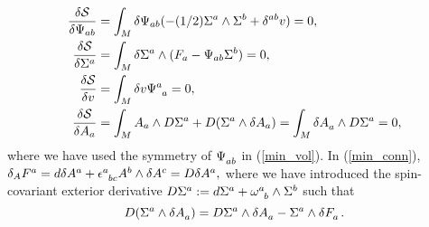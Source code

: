 \documentclass[a4paper,12pt, onecolumn, notitlepage]{article}
\theoremstyle{definition}
\theoremstyle{remark}
\newcommand{\w}{\omega}
\newcommand{\e}{\epsilon}
\begin{document}
\begin{subequations}
\begin{align}
	\label{min_sym}
	\frac{\delta\mathcal{S}}{\delta\Psi_{ab}} &= \int_{M}\delta\Psi_{ab}(- (1/2)\Sigma^{a}\wedge\Sigma^{b} + \delta^{ab}v) = 0,\\
	\label{min_form}
	\frac{\delta\mathcal{S}}{\delta\Sigma^{a}} &= \int_{M}\delta\Sigma^{a}\wedge(F_{a} - \Psi_{ab}\Sigma^{b}) = 0,\\
	\label{min_vol}
	\frac{\delta\mathcal{S}}{\delta v} &= \int_{M}\delta v\Psi\indices{^a_a} = 0,\\
	\label{min_conn}
	\frac{\delta\mathcal{S}}{\delta A_{a}} &= \int_{M}A_{a}\wedge D\Sigma^{a} + D(\Sigma^{a}\wedge\delta A_{a}) = \int_{M}\delta A\indices{_a}\wedge D\Sigma\indices{^a} = 0,
	\end{align}
\end{subequations}
where we have used the symmetry of $\Psi\indices{_a_b}$ in (\ref{min_vol}). In (\ref{min_conn}), $\delta_{A} F\indices{^a}=d\delta A\indices{^a}+\e\indices{^a_b_c}A\indices{^b}\wedge \delta A\indices{^c} = D\delta A\indices{^a},$ where we have introduced the spin-covariant exterior derivative $D\Sigma\indices{^a} := d\Sigma\indices{^a}+ \w\indices{^a_b}\wedge\Sigma\indices{^b}$ such that
\begin{equation*}
	D(\Sigma\indices{^a}\wedge\delta A\indices{_a})=D\Sigma\indices{^a}\wedge\delta A\indices{_a} - \Sigma\indices{^a}\wedge \delta F\indices{_a}.
\end{equation*}
\end{document}
